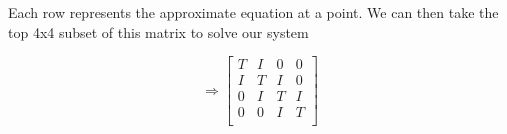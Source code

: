 \documentclass[10pt]{article}
\newcommand{\1}{\mathbb{1}}
\begin{document}
Each row represents the approximate equation at a point. We can then take the top 4x4 subset of this matrix to solve our system 

\[\Rightarrow \begin{bmatrix}
T & I & 0 & 0\\
I & T & I & 0\\
0 & I & T & I\\
0 & 0 & I & T\\
\end{bmatrix}
\]


\noindent \underline{\hspace{3in}}\\
\end{document}
